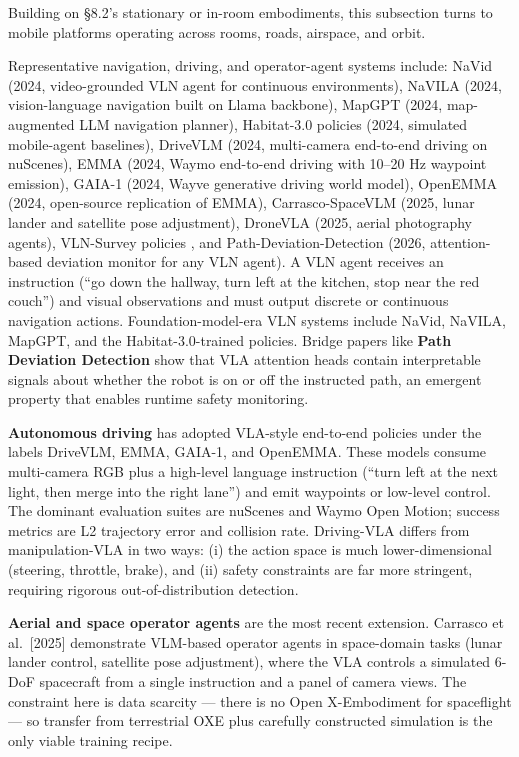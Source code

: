 \documentclass{article}
\begin{document}
Building on §8.2's stationary or in-room embodiments, this subsection turns to mobile platforms operating across rooms, roads, airspace, and orbit.

Representative navigation, driving, and operator-agent systems include: NaVid (2024, video-grounded VLN agent for continuous environments), NaVILA (2024, vision-language navigation built on Llama backbone), MapGPT (2024, map-augmented LLM navigation planner), Habitat-3.0 policies (2024, simulated mobile-agent baselines), DriveVLM (2024, multi-camera end-to-end driving on nuScenes), EMMA (2024, Waymo end-to-end driving with 10--20 Hz waypoint emission), GAIA-1 (2024, Wayve generative driving world model), OpenEMMA (2024, open-source replication of EMMA), Carrasco-SpaceVLM (2025, lunar lander and satellite pose adjustment), DroneVLA (2025, aerial photography agents), VLN-Survey policies \cite{zhang2024visionandlanguagen}, and Path-Deviation-Detection (2026, attention-based deviation monitor for any VLN agent). A VLN agent receives an instruction (``go down the hallway, turn left at the kitchen, stop near the red couch'') and visual observations and must output discrete or continuous navigation actions. Foundation-model-era VLN systems include NaVid, NaVILA, MapGPT, and the Habitat-3.0-trained policies. Bridge papers like \textbf{Path Deviation Detection} \cite{jeong2026yourvisionlanguage} show that VLA attention heads contain interpretable signals about whether the robot is on or off the instructed path, an emergent property that enables runtime safety monitoring.

\textbf{Autonomous driving} has adopted VLA-style end-to-end policies under the labels DriveVLM, EMMA, GAIA-1, and OpenEMMA. These models consume multi-camera RGB plus a high-level language instruction (``turn left at the next light, then merge into the right lane'') and emit waypoints or low-level control. The dominant evaluation suites are nuScenes and Waymo Open Motion; success metrics are L2 trajectory error and collision rate. Driving-VLA differs from manipulation-VLA in two ways: (i) the action space is much lower-dimensional (steering, throttle, brake), and (ii) safety constraints are far more stringent, requiring rigorous out-of-distribution detection.

\textbf{Aerial and space operator agents} are the most recent extension. Carrasco et al.~{[}2025{]} demonstrate VLM-based operator agents in space-domain tasks (lunar lander control, satellite pose adjustment), where the VLA controls a simulated 6-DoF spacecraft from a single instruction and a panel of camera views. The constraint here is data scarcity --- there is no Open X-Embodiment for spaceflight --- so transfer from terrestrial OXE plus carefully constructed simulation is the only viable training recipe.
\end{document}
